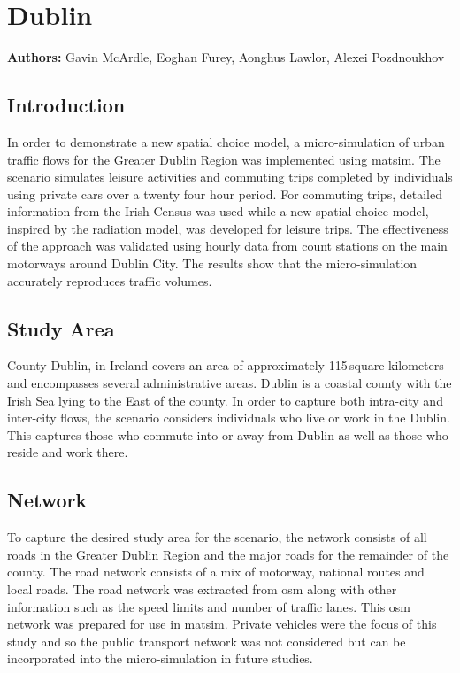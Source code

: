 \section{Dublin}
\label{sec:dublin}
\hfill \textbf{Authors:} Gavin McArdle, Eoghan Furey, Aonghus Lawlor, Alexei Pozdnoukhov

\subsection{Introduction}
In order to demonstrate a new spatial choice model, a micro-simulation of urban traffic flows for the Greater Dublin Region was implemented using \gls{matsim}. The scenario simulates leisure activities and commuting trips completed by individuals using private cars over a twenty four hour period. For commuting trips, detailed information from the Irish Census was used while a new spatial choice model, inspired by the radiation model, was developed for leisure trips. The effectiveness of the approach was validated using hourly data from count stations on the main motorways around Dublin City. The results show that the micro-simulation accurately reproduces traffic volumes.

\subsection{Study Area}
County Dublin, in Ireland covers an area of approximately 115\,square kilometers and encompasses several administrative areas. Dublin is a coastal county with the Irish Sea lying to the East of the county. In order to capture both intra-city and inter-city flows, the scenario considers individuals who live or work in the Dublin. This captures those who commute into or away from Dublin as well as those who reside and work there.

\subsection{Network}
To capture the desired study area for the scenario, the network consists of all roads in the Greater Dublin Region and the major roads for the remainder of the county. The road network consists of a mix of motorway, national routes and local roads. The road network was extracted from \gls{osm} along with other information such as the speed limits and number of traffic lanes. This \gls{osm} network was prepared for use in \gls{matsim}. Private vehicles were the focus of this study and so the public transport network was not considered but can be incorporated into the micro-simulation in future studies.

